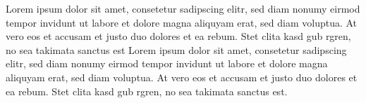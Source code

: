 Lorem ipsum dolor sit amet, consetetur sadipscing elitr, sed diam nonumy eirmod tempor invidunt ut labore et dolore magna aliquyam erat, sed diam voluptua. At vero eos et accusam et justo duo dolores et ea rebum. Stet clita kasd gub rgren, no sea takimata sanctus est Lorem ipsum dolor sit amet, consetetur sadipscing elitr, sed diam nonumy eirmod tempor invidunt ut labore et dolore magna aliquyam erat, sed diam voluptua. At vero eos et accusam et justo duo dolores et ea rebum. Stet clita kasd gub rgren, no sea takimata sanctus est.

